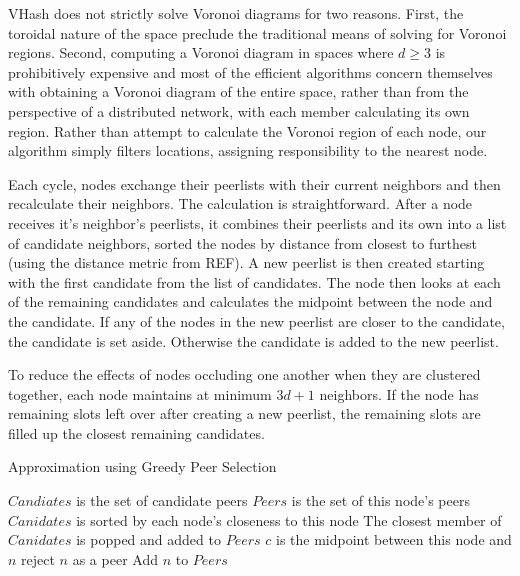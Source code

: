 \documentclass{IEEEtran}
\begin{document}
VHash does not strictly solve Voronoi diagrams \cite{voronoi} for two reasons.  First, the toroidal nature of the space preclude the traditional means of solving for Voronoi regions. Second, computing a Voronoi diagram in spaces where $d \geq 3$ is prohibitively expensive \cite{raynet}%
and most of the efficient algorithms concern themselves with obtaining a Voronoi diagram of the entire space, rather than from the perspective of a distributed network, with each member calculating its own region. Rather than attempt to calculate the Voronoi region of each node, our algorithm simply filters locations, assigning responsibility to the nearest node. 


Each cycle, nodes exchange their peerlists with their current neighbors and then recalculate their neighbors.  
The calculation is straightforward.  After a node receives it's neighbor's peerlists, it combines their peerlists and its own into a list of candidate neighbors, sorted the nodes by distance from closest to furthest (using the distance metric from REF).  A new peerlist is then created starting with the first candidate from the list of candidates.  The node then looks at each of the remaining candidates and calculates the midpoint between the node and the candidate.  If any of the nodes in the new peerlist are closer to the candidate, the candidate is set aside.  Otherwise the candidate is added to the new peerlist.


To reduce the effects of nodes occluding one another when they are clustered together, each node maintains at minimum $3d+1$ neighbors.  If the node has remaining slots left over after creating a new peerlist, the remaining slots are filled up the closest remaining candidates.


\begin{algorithm}
\caption{Approximation using Greedy Peer Selection}
\label{peer}
\begin{algorithmic}[1]  %
	\STATE $Candiates$ is the set of candidate peers
    \STATE $Peers$ is the set of this node's peers
    \STATE $Canidates$ is sorted by each node's closeness to this node
    \STATE The closest member of $Canidates$ is popped and added to $Peers$
    	\STATE $c$ is the midpoint between this node and $n$
        	\STATE reject $n$ as a peer
        \ELSE
        	\STATE Add $n$ to $Peers$
        \ENDIF
    \ENDFOR
\end{algorithmic}
\end{algorithm}
\end{document}
